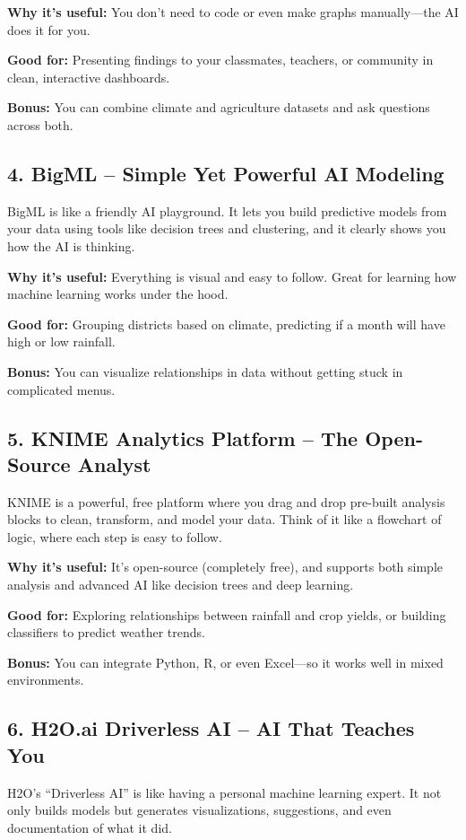 \textbf{Why it’s useful:} You don’t need to code or even make graphs manually—the AI does it for you.

\textbf{Good for:} Presenting findings to your classmates, teachers, or community in clean, interactive dashboards.

\textbf{Bonus:} You can combine climate and agriculture datasets and ask questions across both.

\subsection*{4. BigML – Simple Yet Powerful AI Modeling}
BigML is like a friendly AI playground. It lets you build predictive models from your data using tools like decision trees and clustering, and it clearly shows you how the AI is thinking.

\textbf{Why it’s useful:} Everything is visual and easy to follow. Great for learning how machine learning works under the hood.

\textbf{Good for:} Grouping districts based on climate, predicting if a month will have high or low rainfall.

\textbf{Bonus:} You can visualize relationships in data without getting stuck in complicated menus.

\subsection*{5. KNIME Analytics Platform – The Open-Source Analyst}
KNIME is a powerful, free platform where you drag and drop pre-built analysis blocks to clean, transform, and model your data. Think of it like a flowchart of logic, where each step is easy to follow.

\textbf{Why it’s useful:} It’s open-source (completely free), and supports both simple analysis and advanced AI like decision trees and deep learning.

\textbf{Good for:} Exploring relationships between rainfall and crop yields, or building classifiers to predict weather trends.

\textbf{Bonus:} You can integrate Python, R, or even Excel—so it works well in mixed environments.

\subsection*{6. H2O.ai Driverless AI – AI That Teaches You}
H2O’s “Driverless AI” is like having a personal machine learning expert. It not only builds models but generates visualizations, suggestions, and even documentation of what it did.

